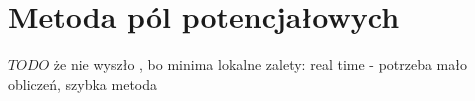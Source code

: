 \section{Metoda pól potencjałowych}
\label{ch:potential-fields}
$TODO$ że nie wyszło , bo minima lokalne
zalety: real time - potrzeba mało obliczeń, szybka metoda